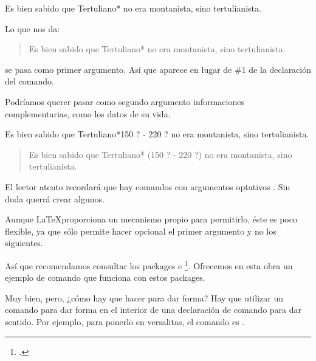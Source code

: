 \begin{latexcode}
\newcommand{\autor}[1]{#1*}
Es bien sabido que \autor{Tertuliano} no era montanista, sino tertulianista.
\end{latexcode}

\newcommand{\autor}[1]{#1*}

Lo que nos da:

\begin{quotation}
Es bien sabido que \autor{Tertuliano} no era montanista, sino tertulianista.
\end{quotation}

 se pasa como primer argumento. Así que aparece en lugar de \#1 de la declaración del comando.

Podríamos querer pasar como segundo argumento informaciones complementarias, como los datos de su vida.

\begin{latexcode}
\newcommand{\autor}[2]{#1* (#2)}
Es bien sabido que \autor{Tertuliano}{150 ? - 220 ?}
no era montanista, sino tertulianista.
\end{latexcode}

\renewcommand{\autor}[2]{#1* (#2)}

\begin{quotation}
Es bien sabido que \autor{Tertuliano}{150 ? - 220 ?}
no era montanista, sino tertulianista.
\end{quotation}

\begin{plusloins}
El lector atento recordará que hay comandos con argumentos optativos . Sin duda querrá crear algunos.

Aunque \LaTeX proporciona un mecanismo propio para permitirlo, éste es poco flexible, ya que sólo permite hacer opcional el primer argumento y no los siguientes.

Así que recomendamos consultar los packages  e \footcites{xargs}{ifthen}. Ofrecemos en esta obra un ejemplo de comando que funciona con estos packages.
\end{plusloins}

Muy bien, pero, ¿cómo hay que hacer para dar forma? Hay que utilizar un comando para dar forma en el interior de una declaración de comando para dar sentido. Por ejemplo, para ponerlo en versalitas, el comando es .

\begin{latexcode}
\newcommand{\autor}[2]{\textsc{#1}* (#2)}
\end{latexcode}

